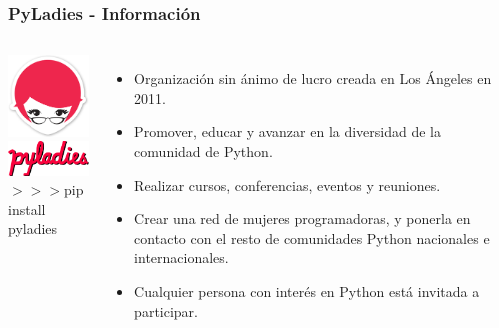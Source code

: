 \documentclass[18pt]{beamer}
\begin{document}
\begin{frame}

	\frametitle{PyLadies - Información}
		
	\begin{columns}
		\centering
			\includegraphics[width=2.5cm]{images/pyladies_cuadrado.png}\\
			\includegraphics[width=3.5cm]{images/pyladies_alargado.png}\\
			\vspace{0.5cm}			
			\small$>>>$pip install pyladies
			
		\begin{itemize}
			\setlength\itemsep{0.6em}		
			\item Organización sin ánimo de lucro creada en Los Ángeles en 2011.
			\item Promover, educar y avanzar en la diversidad de la comunidad de Python.
			\item Realizar cursos, conferencias, eventos y reuniones. 
			\item Crear una red de mujeres programadoras, y ponerla en contacto con el 
			resto de comunidades Python nacionales e internacionales.
			\item Cualquier persona con interés en Python está invitada a participar.  
		\end{itemize}
	\end{columns}
	
\end{frame}
\end{document}
